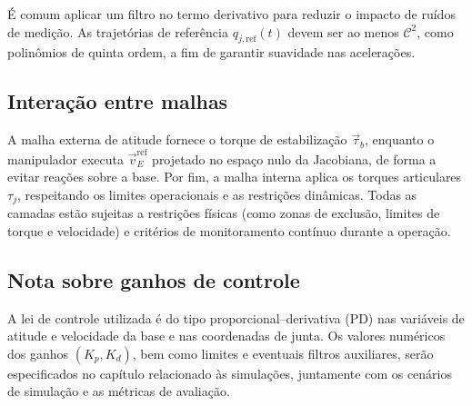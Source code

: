 É comum aplicar um filtro no termo derivativo para reduzir o impacto de ruídos de medição. As trajetórias de referência $ q_{j,\text{ref}}(t) $ devem ser ao menos $ \mathcal{C}^2 $, como polinômios de quinta ordem, a fim de garantir suavidade nas acelerações.

\subsection{Interação entre malhas}

A malha externa de atitude fornece o torque de estabilização $ \vec{\tau}_b $, enquanto o manipulador executa $ \vec{v}_E^{\text{ref}} $ projetado no espaço nulo da Jacobiana, de forma a evitar reações sobre a base.
Por fim, a malha interna aplica os torques articulares $ \tau_j $, respeitando os limites operacionais e as restrições dinâmicas.
Todas as camadas estão sujeitas a restrições físicas (como zonas de exclusão, limites de torque e velocidade) e critérios de monitoramento contínuo durante a operação.

\subsection{Nota sobre ganhos de controle}

A lei de controle utilizada é do tipo proporcional--derivativa (PD) nas variáveis de atitude e velocidade da base e nas coordenadas de junta.
Os valores numéricos dos ganhos $(K_p,K_d)$, bem como limites e eventuais filtros auxiliares, serão especificados no capítulo relacionado às simulações, juntamente com os cenários de simulação e as métricas de avaliação.
